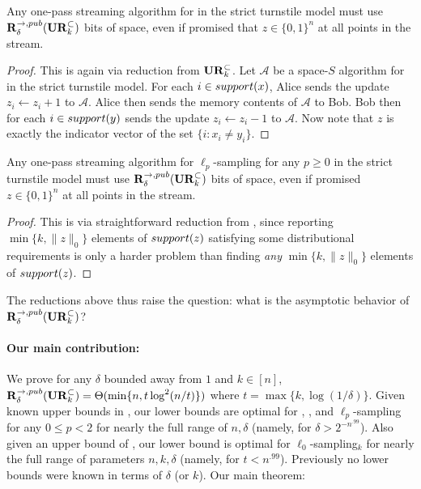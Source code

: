 \begin{claim}
Any one-pass streaming algorithm for  in the strict turnstile model must use $\mathbf{R}^{\rightarrow,pub}_{\delta}(\mathbf{UR}_k^\subset)$ bits of space, even if promised that $z\in\{0,1\}^n$ at all points in the stream.
\end{claim}
\begin{proof}
This is again via reduction from $\mathbf{UR}_k^\subset$. Let $\mathcal{A}$ be a space-$S$ algorithm for  in the strict turnstile model. For each $i\in\mathop{support}(x)$, Alice sends the update $z_i \leftarrow z_i + 1$ to $\mathcal{A}$. Alice then sends the memory contents of $\mathcal{A}$ to Bob. Bob then for each $i\in\mathop{support}(y)$ sends the update $z_i\leftarrow z_i - 1$ to $\mathcal{A}$. Now note that $z$ is exactly the indicator vector of the set $\{i : x_i\neq y_i\}$.
\end{proof}

\begin{claim}
Any one-pass streaming algorithm for $\ell_p$-sampling for any $p\ge 0$ in the strict turnstile model must use $\mathbf{R}^{\rightarrow,pub}_{\delta}(\mathbf{UR}_k^\subset)$ bits of space, even if promised $z\in\{0,1\}^n$ at all points in the stream.
\end{claim}
\begin{proof}
This is via straightforward reduction from , since reporting $\min\{k,\|z\|_0\}$ elements of $\mathop{support}(z)$ satisfying some distributional requirements is only a harder problem than finding {\em any} $\min\{k,\|z\|_0\}$ elements of $\mathop{support}(z)$.
\end{proof}

The reductions above thus raise the question: what is the asymptotic behavior of $\mathbf{R}^{\rightarrow,pub}_\delta(\mathbf{UR}_k^\subset)$?

\paragraph{Our main contribution:} We prove for any $\delta$ bounded away from $1$ and $k\in[n]$, $\mathbf{R}^{\rightarrow,pub}_\delta(\mathbf{UR}_k^\subset) = \Theta(\min\{n, t\log^2(n/t)\})$ where $t = \max\{k,\log(1/\delta)\}$. Given known upper bounds in \cite{JowhariST11}, our lower bounds are optimal for , \suppfind{}, and $\ell_p$-sampling for any $0\le p<2$ for nearly the full range of $n, \delta$ (namely, for $\delta > 2^{-n^{.99}}$). Also given an upper bound of \cite{JowhariST11}, our lower bound is optimal for $\ell_0$-sampling$_k$ for nearly the full range of parameters $n, k, \delta$ (namely, for $t < n^{.99}$). Previously no lower bounds were known in terms of $\delta$ (or $k$). Our main theorem:

